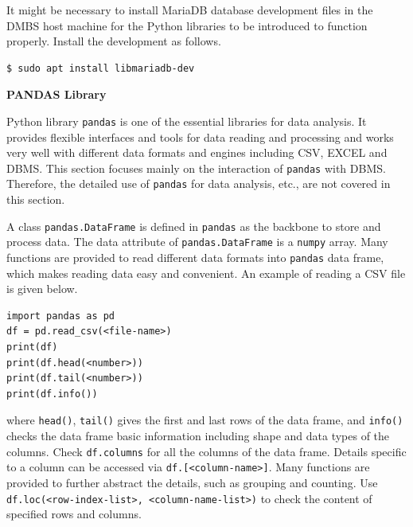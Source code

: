 It might be necessary to install MariaDB database development files in the DMBS host machine for the Python libraries to be introduced to function properly. Install the development as follows.
\begin{lstlisting}
$ sudo apt install libmariadb-dev
\end{lstlisting}

\vspace{0.1in}
\noindent \textbf{PANDAS Library}
\vspace{0.1in}

Python library \verb|pandas| is one of the essential libraries for data analysis. It provides flexible interfaces and tools for data reading and processing and works very well with different data formats and engines including CSV, EXCEL and DBMS. This section focuses mainly on the interaction of \verb|pandas| with DBMS. Therefore, the detailed use of \verb|pandas| for data analysis, etc., are not covered in this section.

A class \verb|pandas.DataFrame| is defined in \verb|pandas| as the backbone to store and process data. The data attribute of \verb|pandas.DataFrame| is a \verb|numpy| array. Many functions are provided to read different data formats into \verb|pandas| data frame, which makes reading data easy and convenient. An example of reading a CSV file is given below.
\begin{lstlisting}
import pandas as pd
df = pd.read_csv(<file-name>)
print(df)
print(df.head(<number>))
print(df.tail(<number>))
print(df.info())
\end{lstlisting}
where \verb|head()|, \verb|tail()| gives the first and last rows of the data frame, and \verb|info()| checks the data frame basic information including shape and data types of the columns. Check \verb|df.columns| for all the columns of the data frame. Details specific to a column can be accessed via \verb|df.[<column-name>]|. Many functions are provided to further abstract the details, such as grouping and counting. Use \verb|df.loc(<row-index-list>, <column-name-list>)| to check the content of specified rows and columns.

